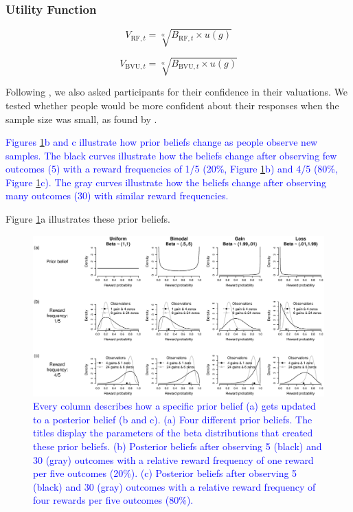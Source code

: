 \documentclass[a4paper, man, natbib, floatsintext]{apa6} %
\begin{document}
\subsubsection{Utility Function}

$$V_{\mathrm{RF}, t} = \sqrt[\mathrm{\alpha}]{{B}_{\mathrm{RF}, t} \times u({g})}$$

$$V_{\mathrm{BVU}, t} = \sqrt[\mathrm{\alpha}]{{B}_{\mathrm{BVU}, t} \times u({g})}$$


Following \cite{Griffin1992}, we also asked participants for their confidence in their valuations. We tested whether people would be more confident about their responses when the sample size was small, as found by \cite{Griffin1992}. 

\textcolor{blue}{Figures \ref{fig:sensi}b  and c illustrate how prior beliefs change as people observe new samples. The black curves illustrate how the beliefs change after observing few outcomes (5) with a reward frequencies of 1/5 (20\%, Figure \ref{fig:sensi}b)  and 4/5 (80\%, Figure \ref{fig:sensi}c). The gray curves illustrate how the beliefs change after observing many outcomes (30) with similar reward frequencies.}


Figure \ref{fig:sensi}a illustrates these prior beliefs.
\begin{figure}[htbp] 
  \centering
\includegraphics[width=1\linewidth, keepaspectratio]{sensi1.eps}
  \caption{\textcolor{blue}{Every column describes how a specific prior belief (a) gets updated to a posterior belief (b and c). (a) Four different prior beliefs. The titles display the parameters of the beta distributions that created these prior beliefs. (b) Posterior beliefs after observing 5 (black) and 30 (gray) outcomes with a relative reward frequency of one reward per five outcomes (20\%). (c) Posterior beliefs after observing 5 (black) and 30 (gray) outcomes with a relative reward frequency of four rewards per five outcomes (80\%).}}
  \label{fig:sensi}
\end{figure}
\end{document}
